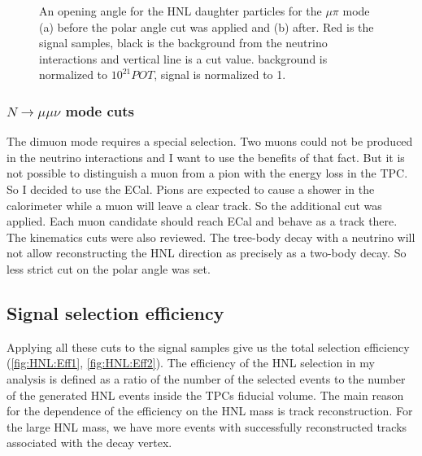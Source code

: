 \documentclass[../main.tex]{subfiles}
\begin{document}
\begin{figure}[!ht]
  \begin{minipage}[h]{0.49\linewidth}
  \end{minipage}
  \hfill
  \begin{minipage}[h]{0.49\linewidth}
  \end{minipage}
  \caption{An opening angle for the HNL daughter particles for the $\mu\pi$ mode (a) before the polar angle cut was applied and (b) after. Red is the signal samples, black is the background from the neutrino interactions and vertical line is a cut value. background is normalized to $10^{21}POT$, signal is normalized to 1.}
  \label{fig:HNL:kin2}
\end{figure}

\subsubsection{\texorpdfstring{$N\to\mu\mu\nu$}{Lg}  mode cuts}
The dimuon mode requires a special selection. Two muons could not be produced in the neutrino interactions and I want to use the benefits of that fact. But it is not possible to distinguish a muon from a pion with the energy loss in the TPC. So I decided to use the ECal. Pions are expected to cause a shower in the calorimeter while a muon will leave a clear track. So the additional cut was applied. Each muon candidate should reach ECal and behave as a track there. The kinematics cuts were also reviewed. The tree-body decay with a neutrino will not allow reconstructing the HNL direction as precisely as a two-body decay. So less strict cut on the polar angle was set.

\subsection{Signal selection efficiency}
\label{sec:HNL:eff}

Applying all these cuts to the signal samples give us the total selection efficiency (\autoref{fig:HNL:Eff1}, \autoref{fig:HNL:Eff2}). The efficiency of the HNL selection in my analysis is defined as a ratio of the number of the selected events to the number of the generated HNL events inside the TPCs fiducial volume. The main reason for the dependence of the efficiency on the HNL mass is track reconstruction. For the large HNL mass, we have more events with successfully reconstructed tracks associated with the decay vertex.
\end{document}

